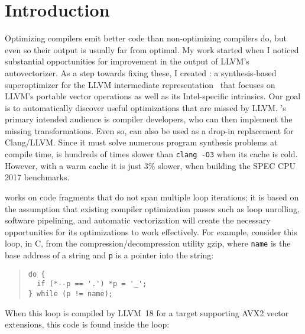 \section{Introduction}

Optimizing compilers emit better code than non-optimizing compilers
do, but even so their output is usually far from optimal.
%
My work started when I noticed substantial opportunities for
improvement in the output of LLVM's autovectorizer.
%
As a step towards fixing these, I created \minotaur{}: a synthesis-based
superoptimizer for the LLVM intermediate
representation~\cite{LLVM:CGO04} that focuses on LLVM's portable
vector operations as well as its Intel-specific intrinsics.
%
Our goal is to automatically discover useful optimizations that are
missed by LLVM\@.
%
\minotaur's primary intended audience is compiler developers, who can then
implement the missing transformations.
%
Even so, \minotaur{} can also be used as a drop-in replacement for
Clang/LLVM\@.
%
Since it must solve numerous program synthesis problems at compile
time, \minotaur{} is hundreds of times slower than \texttt{clang -O3}
when its cache is cold.
%
However, with a warm cache it is just 3\% slower, when building the
SPEC CPU 2017 benchmarks.


\minotaur{} works on code fragments that do not span multiple loop
iterations; it is based on the assumption that existing compiler
optimization passes such as loop unrolling, software pipelining, and
automatic vectorization will create the necessary opportunities for
its optimizations to work effectively.
%
For example, consider this loop, in C, from the
compression/decompression utility gzip, where \texttt{name} is the
base address of a string and \texttt{p} is a pointer into the string:

\iffalse
\begin{verbatim}
void make_simple_name(char *name) {
  char *p = strrchr(name, '.');
  if (p == NULL) return;
  if (p == name) p++;
  do {
      if (*--p == '.') *p = '_';
  } while (p != name);
}
\end{verbatim}
\fi

{\begin{quote}
\begin{verbatim}
do {
  if (*--p == '.') *p = '_';
} while (p != name);
\end{verbatim}
\end{quote}}

When this loop is compiled by LLVM~18 for a target supporting AVX2
vector extensions, this code is found inside the loop:


